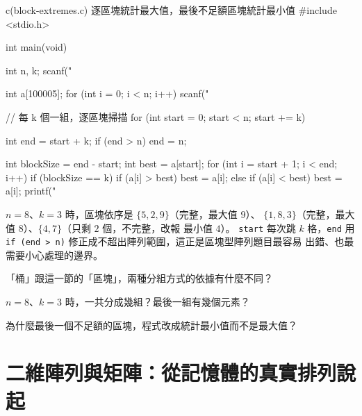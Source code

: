 \begin{example}{c}{(block-extremes.c) 逐區塊統計最大值，最後不足額區塊統計最小值}
#include <stdio.h>

int main(void) {
    int n, k;
    scanf("%

    int a[100005];
    for (int i = 0; i < n; i++) {
        scanf("%
    }

    // 每 k 個一組，逐區塊掃描
    for (int start = 0; start < n; start += k) {
        int end = start + k;
        if (end > n) {
            end = n;
        }

        int blockSize = end - start;
        int best = a[start];
        for (int i = start + 1; i < end; i++) {
            if (blockSize == k) {
                if (a[i] > best) {
                    best = a[i];
                }
            } else {
                if (a[i] < best) {
                    best = a[i];
                }
            }
        }
        printf("%
    }
}
\end{example}


$n = 8$、$k = 3$ 時，區塊依序是 $\{5,2,9\}$（完整，最大值 $9$）、
$\{1,8,3\}$（完整，最大值 $8$）、$\{4,7\}$（只剩 $2$ 個，不完整，改報
最小值 $4$）。 \texttt{start} 每次跳 $k$ 格，\texttt{end} 用
\texttt{if (end > n)} 修正成不超出陣列範圍，這正是區塊型陣列題目最容易
出錯、也最需要小心處理的邊界。


\begin{drills}[label=drills:array-sliding-window]
\item 「桶」跟這一節的「區塊」，兩種分組方式的依據有什麼不同？
\item $n = 8$、$k = 3$ 時，一共分成幾組？最後一組有幾個元素？
\item 為什麼最後一個不足額的區塊，程式改成統計最小值而不是最大值？
\end{drills}

\section{二維陣列與矩陣：從記憶體的真實排列說起}
\label{sec:array-2d-memory}

